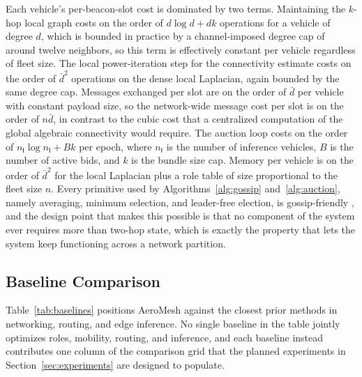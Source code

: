 \documentclass[drones,article,submit,moreauthors]{Definitions/mdpi}
\begin{document}
Each vehicle's per-beacon-slot cost is dominated by two terms. Maintaining the $k$-hop local graph costs on the order of $d \log d + d k$ operations for a vehicle of degree $d$, which is bounded in practice by a channel-imposed degree cap of around twelve neighbors, so this term is effectively constant per vehicle regardless of fleet size. The local power-iteration step for the connectivity estimate costs on the order of $\bar{d}^2$ operations on the dense local Laplacian, again bounded by the same degree cap. Messages exchanged per slot are on the order of $\bar{d}$ per vehicle with constant payload size, so the network-wide message cost per slot is on the order of $n \bar{d}$, in contrast to the cubic cost that a centralized computation of the global algebraic connectivity would require. The auction loop costs on the order of $n_{\mathsf{I}} \log n_{\mathsf{I}} + B k$ per epoch, where $n_{\mathsf{I}}$ is the number of inference vehicles, $B$ is the number of active bids, and $k$ is the bundle size cap. Memory per vehicle is on the order of $\bar{d}^2$ for the local Laplacian plus a role table of size proportional to the fleet size $n$. Every primitive used by Algorithms~\ref{alg:gossip} and~\ref{alg:auction}, namely averaging, minimum selection, and leader-free election, is gossip-friendly \cite{dimakis2010gossip}, and the design point that makes this possible is that no component of the system ever requires more than two-hop state, which is exactly the property that lets the system keep functioning across a network partition.

\subsection{Baseline Comparison}

Table~\ref{tab:baselines} positions AeroMesh against the closest prior methods in networking, routing, and edge inference. No single baseline in the table jointly optimizes roles, mobility, routing, and inference, and each baseline instead contributes one column of the comparison grid that the planned experiments in Section~\ref{sec:experiments} are designed to populate.
\end{document}
